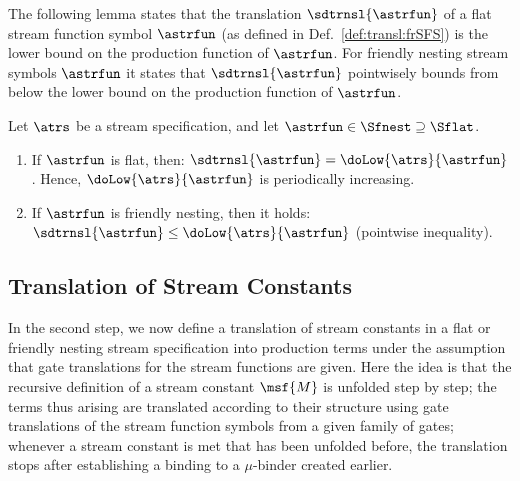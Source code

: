 The following lemma states that the translation $\sdtrnsl{\astrfun}$ 
of a flat stream function symbol $\astrfun$ (as defined in Def.~\ref{def:transl:frSFS})
is the \daob{} lower bound on the production function of $\astrfun$.
For friendly nesting stream symbols $\astrfun$ it states
that $\sdtrnsl{\astrfun}$ pointwisely bounds from below
the \daob{} lower bound on the production function of $\astrfun$.

\begin{lemma}\label{lem:transl:soundness}
  Let $\atrs$ be a stream specification, 
  and let\/ $\astrfun \in \Sfnest \supseteq \Sflat$.
  \begin{enumerate}
    \item If\/ $\astrfun$ is flat, then:\/
      $\sdtrnsl{\astrfun} = \doLow{\atrs}{\astrfun}$.
      Hence, $\doLow{\atrs}{\astrfun}$ is periodically increasing.
    \item If\/ $\astrfun$ is friendly nesting, then it holds:\/
      $\sdtrnsl{\astrfun} \le \doLow{\atrs}{\astrfun}$
      (pointwise inequality).
  \end{enumerate}
\end{lemma}



\subsection{Translation of Stream Constants}
  \label{sec:translation:subsec:constants}


In the second step, we now define a translation of 
  stream constants
in a flat or friendly nesting stream specification into production terms
under the assumption that gate translations for the stream functions are given.
Here the idea is that the recursive definition of a stream constant 
$\msf{M}$ is unfolded step by step;
the terms thus arising are translated according to their
structure using gate translations of the stream function symbols
from a given family of gates;
whenever a stream constant is met that has been unfolded before,
the translation stops after establishing a binding to a $\mu$-binder 
created earlier.


